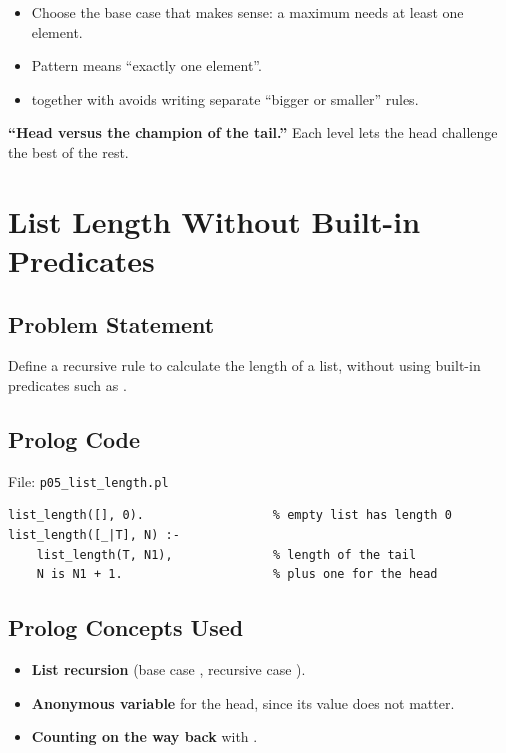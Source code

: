 \documentclass[11pt,a4paper]{article}
\newcommand{\pred}[1]{\texttt{\detokenize{#1}}}
\begin{document}
\begin{keybox}
\begin{itemize}[leftmargin=*]
  \item Choose the base case that makes sense: a maximum needs at least one element.
  \item Pattern \pred{[X]} means ``exactly one element''.
  \item \pred{is} together with \pred{max/2} avoids writing separate ``bigger or smaller'' rules.
\end{itemize}
\end{keybox}
\begin{mnbox}
\textbf{``Head versus the champion of the tail.''} Each level lets the head challenge the best of the rest.
\end{mnbox}

\newpage
\section{List Length Without Built-in Predicates}
\setcounter{subsection}{0}
\subsection{Problem Statement}
Define a recursive rule to calculate the length of a list, without using built-in predicates such as \pred{length/2}.

\subsection{Prolog Code}
File: \texttt{p05\_list\_length.pl}
\begin{lstlisting}[style=pl]
list_length([], 0).                  % empty list has length 0
list_length([_|T], N) :-
    list_length(T, N1),              % length of the tail
    N is N1 + 1.                     % plus one for the head
\end{lstlisting}

\subsection{Prolog Concepts Used}
\begin{itemize}[leftmargin=*]
  \item \textbf{List recursion} (base case \pred{[]}, recursive case \pred{[_|T]}).
  \item \textbf{Anonymous variable \pred{_}} for the head, since its value does not matter.
  \item \textbf{Counting on the way back} with \pred{is}.
\end{itemize}
\end{document}
